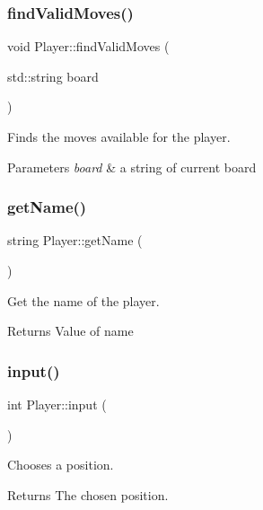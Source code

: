 \subsubsection{\texorpdfstring{find\+Valid\+Moves()}{findValidMoves()}}
{\footnotesize\ttfamily void Player\+::find\+Valid\+Moves (\begin{DoxyParamCaption}\item[{std\+::string}]{board }\end{DoxyParamCaption})}



Finds the moves available for the player. 


\begin{DoxyParams}{Parameters}
{\em board} & a string of current board \\
\hline
\end{DoxyParams}
\mbox{\label{classPlayer_af9a6045fa96f736664c4eab4caa5e8e5}} 
\subsubsection{\texorpdfstring{get\+Name()}{getName()}}
{\footnotesize\ttfamily string Player\+::get\+Name (\begin{DoxyParamCaption}{ }\end{DoxyParamCaption})}



Get the name of the player. 

\begin{DoxyReturn}{Returns}
Value of name 
\end{DoxyReturn}
\mbox{\label{classPlayer_a3e7c5ce7c59c8b5cc9d0b985a1baae91}} 
\subsubsection{\texorpdfstring{input()}{input()}}
{\footnotesize\ttfamily int Player\+::input (\begin{DoxyParamCaption}{ }\end{DoxyParamCaption})\hspace{0.3cm}{\ttfamily [virtual]}}



Chooses a position. 

\begin{DoxyReturn}{Returns}
The chosen position. 
\end{DoxyReturn}


